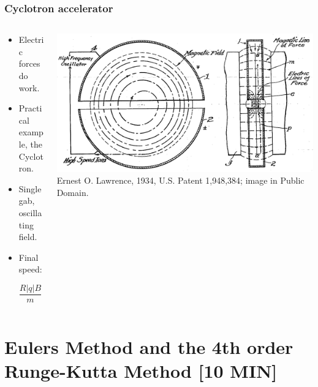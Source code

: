 \documentclass{beamer}
\begin{document}
\begin{frame}
\frametitle{Cyclotron accelerator}
\begin{columns}
\begin{column}{0.5\linewidth}
\begin{itemize}
\item<1-> Electric forces do work.

\item<2-> Practical example, the Cyclotron.

\item<3-> Single gab, oscillating field.

\item<4-> Final speed:

\begin{equation*}
\frac{R|q|B}{m} = v_\perp
\end{equation*}

\end{itemize}
\end{column}
\begin{column}{0.5\linewidth}
\includegraphics[width=\linewidth]{ Cyclotron_patent.png}
{\color{gray} Ernest O. Lawrence, 1934, U.S. Patent 1,948,384; image in Public Domain.}
\end{column}
\end{columns}
\end{frame}

\section{Eulers Method and the 4th order Runge-Kutta Method [10 MIN]}
\end{document}
